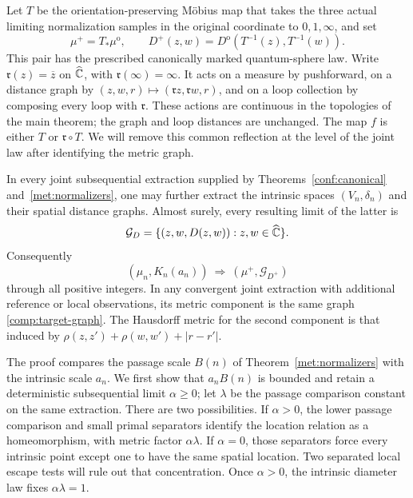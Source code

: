 Let $T$ be the orientation-preserving M\"obius map that takes the
three actual limiting normalization samples in the original coordinate
to $0,1,\infty$, and set
\[
 \mu^+=T_*\mu^{\mathrm o},\qquad
 D^+(z,w)=D^{\mathrm o}(T^{-1}(z),T^{-1}(w)).
\]
This pair has the prescribed canonically marked quantum-sphere law.
Write $\mathfrak r(z)=\overline z$ on $\widehat{\mathbb C}$, with
$\mathfrak r(\infty)=\infty$.  It acts on a measure by pushforward,
on a distance graph by
$(z,w,r)\mapsto(\mathfrak r z,\mathfrak r w,r)$, and on a loop
collection by composing every loop with $\mathfrak r$.  These actions
are continuous in the topologies of the main theorem; the graph and
loop distances are unchanged.  The map $f$ is either $T$ or
$\mathfrak r\circ T$.  We will remove this common reflection at
the level of the joint law after identifying the metric graph.

\begin{theorem}
\label{comp:metric-graph}
In every joint subsequential extraction supplied by
Theorems~\ref{conf:canonical} and~\ref{met:normalizers}, one may further
extract the intrinsic spaces $(V_n,\delta_n)$ and their spatial distance
graphs.  Almost surely, every resulting limit of the latter is
\begin{equation}
 \label{comp:target-graph}
 \mathcal G_D
   =\{(z,w,D(z,w)):z,w\in\Chat\}.
\end{equation}
Consequently
\[
 (\mu_n,K_n(a_n))\ \Longrightarrow\ (\mu^+,\mathcal G_{D^+})
\]
through all positive integers.  In any convergent joint extraction
with additional reference or local observations, its metric
component is the same graph \eqref{comp:target-graph}.  The
Hausdorff metric for the second component is that induced by
$\rho(z,z')+\rho(w,w')+|r-r'|$.
\end{theorem}

The proof compares the passage scale $B(n)$ of
Theorem~\ref{met:normalizers} with the intrinsic scale $a_n$.
We first show that $a_nB(n)$ is bounded and retain a deterministic
subsequential limit $\alpha\geq0$; let $\lambda$ be the passage
comparison constant on the same extraction.  There are two possibilities.
If $\alpha>0$, the lower passage comparison and small primal
separators identify the location relation as a homeomorphism, with
metric factor $\alpha\lambda$.  If $\alpha=0$, those separators
force every intrinsic point except one to have the same spatial
location.  Two separated local escape tests will rule out that
concentration.  Once $\alpha>0$, the intrinsic diameter law fixes
$\alpha\lambda=1$.

